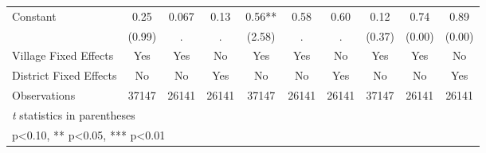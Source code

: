 \begin{sidewaystable}[htbp]
\begin{tabular}{l*{9}{c}}
Constant        &     0.25   &    0.067   &     0.13   &     0.56** &     0.58   &     0.60   &     0.12   &     0.74   &     0.89   \\
                &   (0.99)   &        .   &        .   &   (2.58)   &        .   &        .   &   (0.37)   &   (0.00)   &   (0.00)   \\
Village Fixed Effects&      Yes   &      Yes   &       No   &      Yes   &      Yes   &       No   &      Yes   &      Yes   &       No   \\
District Fixed Effects&       No   &       No   &      Yes   &       No   &       No   &      Yes   &       No   &       No   &      Yes   \\
\midrule
Observations    &    37147   &    26141   &    26141   &    37147   &    26141   &    26141   &    37147   &    26141   &    26141   \\
\bottomrule
\multicolumn{10}{l}{\footnotesize \textit{t} statistics in parentheses}\\
\multicolumn{10}{l}{\footnotesize * p<0.10, ** p<0.05, *** p<0.01}\\
\end{tabular}
\end{sidewaystable}
